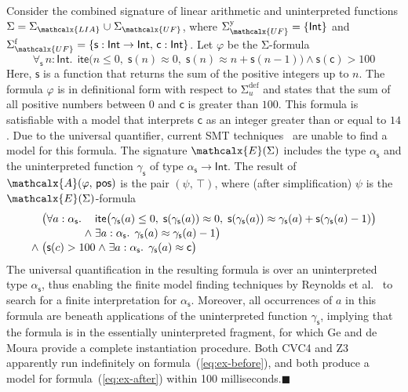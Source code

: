 \documentclass[runningheads,a4paper]{llncs}
\newcommand{\con}[1]{\mathsf{#1}}
\let\const=\con
\let\oldSigma=\Sigma
\def\Sigma{\mathrm{\oldSigma}}
\let\oldwedge=\wedge
\def\wedge{\mathrel{\oldwedge}}
\newcommand\cvc{CVC4\xspace}
\newcommand\ziii{Z3\xspace}
\newcommand{\teq}{\approx}
\newcommand{\conv}{\mathcalx{A}}
\newcommand{\ssorts}[1]{#1^\mathrm{y}}
\newcommand{\sfuns}[1]{#1^\mathrm{f}}
\newcommand{\sfundefs}[1]{#1^\mathrm{def}}
\newcommand{\sortint}{\ty{Int}}
\newcommand{\ppos}{\con{pos}}
\newcommand\ty[1]{\con{#1}}
\newcommand{\ltrue}{\top}
\newcommand{\lite}{\con{ite}}
\newcommand\concret{\gamma} %
\newcommand{\forallf}[1]{\forall_{\!#1\:}}
\newcommand{\farg}[1]{\concret_{#1}}
\newcommand{\fargsort}[1]{\alpha_{#1}}
\newcommand{\Sigmalia}{\Sigma_{\mathcalx{LIA}}}
\newcommand{\extendsig}[1]{\mathcalx{E}( #1 )}
\newcommand{\euf}{\ensuremath{\mathcalx{UF}}\xspace}
\newcommand\xend{{\hfill$\scriptstyle\blacksquare$}}
\begin{document}
\begin{example}
\label{ex:translation}
Consider the combined signature of linear arithmetic and uninterpreted
functions $\Sigma = \Sigmalia \mathrel{\cup} \Sigma_{\euf}$, where
$\ssorts{\Sigma_{\euf}} = \{ \sortint \}$ and
$\sfuns{\Sigma_{\euf}} = \{ \con{s} : { \sortint \rightarrow \sortint },\, \const{c} : { \sortint } \}$.
Let $\varphi$ be the $\Sigma$-formula
\begin{equation} \label{eq:ex-before}
\forallf{\con{s}} n : {\sortint}.\;\, \lite\bigl( n \leq 0,\; \con{s}(n) \teq 0,\;
  \con{s}( n ) \teq n + \con{s}( n - 1 ) \bigr) \wedge \con{s}( \con{c} ) > 100
\end{equation}
%
Here, $\const{s}$ is a function that returns the sum of the positive integers
up to $n$. The formula $\varphi$ is in definitional form with
respect to $\sfundefs{\Sigma_u}$ and states that the sum of all
positive numbers between $0$ and $\const{c}$ is greater than $100$. This formula is
satisfiable with a model that interprets $\const{c}$ as an integer greater than or
equal to $14$. Due to the universal quantifier,
current SMT techniques~\cite{GeDeM-CAV-09, ReyEtAl-1-RR-13} are unable to find
a model for this formula. The signature $\extendsig{\Sigma}$ includes the type
$\fargsort{\con{s}}$ and the uninterpreted function $\farg{\con{s}}$ of type $\fargsort{\con{s}}
\rightarrow \sortint$. The result of $\conv( \varphi,\, \ppos )$ is the pair $(
\psi,\, \ltrue )$, where (after simplification) $\psi$ is the
$\extendsig{\Sigma}$-formula
%
\begin{equation} \label{eq:ex-after}
\!\begin{aligned}[c]
  & \phantom{{\wedge}\; }\bigl(
    \!\begin{aligned}[t]
      \forall a : \fargsort{\con{s}}.\; & \phantom{{\wedge}\;}\lite\bigl( \farg{\con{s}}( a ) \leq 0,\;
        \con{s}(\farg{\con{s}}( a )) \teq 0,\;
        \con{s}(\farg{\con{s}}( a )) \teq \farg{\con{s}}( a ) + \con{s}( \farg{\con{s}}( a )-1 ) \bigr)
\\[-\jot]
      & {\wedge}\; \exists a : {\fargsort{\con{s}}}.\;\, \farg{\con{s}}( a ) \teq \farg{\con{s}}( a )-1 \bigr)
\end{aligned}
\\[-\jot]
 & {\wedge}\; \bigl( \con{s}( c ) > 100 \wedge \exists a : {\fargsort{\con{s}}}.\;\, \farg{\con{s}}( a ) \teq \con{c} \bigr)
\end{aligned}
\end{equation}
%
The universal quantification in the resulting formula is over an uninterpreted
type $\fargsort{\con{s}}$, thus enabling the finite model finding
techniques by Reynolds et al.\ \cite{ReyEtAl-1-RR-13} to search for a finite interpretation for
$\fargsort{\con{s}}$. Moreover, all occurrences of $a$ in this formula are beneath
applications of the uninterpreted function $\farg{\con{s}}$, implying that the
formula is in the essentially uninterpreted fragment,
for which Ge and de Moura \cite{GeDeM-CAV-09} provide a complete instantiation
procedure. Both
\cvc and \ziii apparently run indefinitely on formula~(\ref{eq:ex-before}), and both
produce a model for formula~(\ref{eq:ex-after}) within 100 milliseconds.\xend
\end{example}
\end{document}
